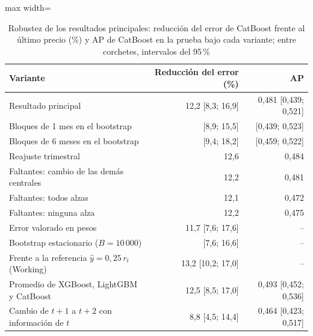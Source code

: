 \begin{table}[htbp]\centering\small
\caption{Robustez de los resultados principales: reducción del error de CatBoost frente al último precio (\%) y AP de CatBoost en la prueba bajo cada variante; entre corchetes, intervalos del 95\,\%}\label{tab:robustez}
\begin{adjustbox}{max width=\textwidth}\begin{tabular}{lrr}\toprule
Variante & Reducción del error (\%) & AP\\ \midrule
Resultado principal & 12{,}2 [8{,}3; 16{,}9] & 0{,}481 [0{,}439; 0{,}521] \\
Bloques de 1 mes en el bootstrap & [8{,}9; 15{,}5] & [0{,}439; 0{,}523] \\
Bloques de 6 meses en el bootstrap & [9{,}4; 18{,}2] & [0{,}459; 0{,}522] \\
Reajuste trimestral & 12{,}6 & 0{,}484 \\
Faltantes: cambio de las demás centrales & 12{,}2 & 0{,}481 \\
Faltantes: todos alzas & 12{,}1 & 0{,}472 \\
Faltantes: ninguna alza & 12{,}2 & 0{,}475 \\
Error valorado en pesos & 11{,}7 [7{,}6; 17{,}6] & -- \\
\midrule
Bootstrap estacionario ($B=10\,000$) & [7{,}6; 16{,}6] & -- \\
Frente a la referencia $\hat y=0{,}25\,r_t$ (Working) & 13{,}2 [10{,}2; 17{,}0] & -- \\
Promedio de XGBoost, LightGBM y CatBoost & 12{,}5 [8{,}5; 17{,}0] & 0{,}493 [0{,}452; 0{,}536] \\
Cambio de $t+1$ a $t+2$ con información de $t$ & 8{,}8 [4{,}5; 14{,}4] & 0{,}464 [0{,}423; 0{,}517] \\
\bottomrule\end{tabular}\end{adjustbox}\end{table}
